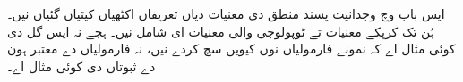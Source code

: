\documentclass[../../../include/open-logic-chapter]{subfiles}
\begin{document}

\begin{editorial}
  ایس باب وچ وجدانیت پسند منطق دی معنیات دیاں تعریفاں اکٹھیاں کیتیاں گئیاں نیں۔
  ہُن تک کرپکے معنیات تے ٹوپولوجی والی معنیات ای شامل نیں۔ ہجے نہ ایس
  گل دی کوئی مثال اے کہ نمونے فارمولیاں نوں کیویں سچ کردے نیں، نہ
  فارمولیاں دے معتبر ہون دے ثبوتاں دی کوئی مثال اے۔
\end{editorial}


\OLEndChapterHook
\end{document}
